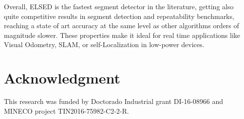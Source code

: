 \documentclass[preprint,12pt]{elsarticle}
\begin{document}
Overall, ELSED is the fastest segment detector in the literature, getting also quite competitive results in segment detection and repeatability benchmarks, reaching a state of art accuracy at the same level as other algorithms orders of magnitude slower. These properties make it ideal for real time applications like Visual Odometry, SLAM, or self-Localization in low-power devices. 

\section*{Acknowledgment}

This research was funded by Doctorado Industrial grant DI-16-08966 and MINECO project TIN2016-75982-C2-2-R.

 

\end{document}
